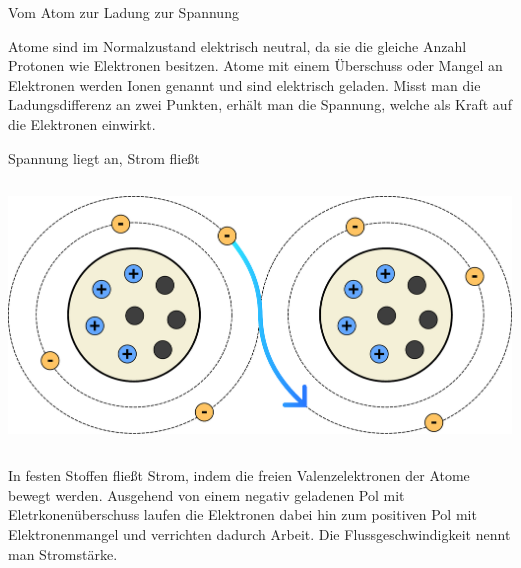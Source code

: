 \begin{frame}{Vom Atom zur Ladung zur Spannung}
    \bigskip
    \bigskip

    \parbox{\linewidth}{
        \footnotesize
        Atome sind im Normalzustand elektrisch neutral, da sie die gleiche Anzahl
        Protonen wie Elektronen besitzen. Atome mit einem Überschuss oder Mangel
        an Elektronen werden \glqq{}Ionen\grqq{} genannt und sind \glqq{}elektrisch
        geladen\grqq{}. Misst man die Ladungsdifferenz an zwei Punkten, erhält man
        die \glqq{}Spannung\grqq{}, welche als Kraft auf die Elektronen einwirkt.
    }
\end{frame}

\begin{frame}{Spannung liegt an, Strom fließt}
    \begin{columns}
        \column{\dimexpr\paperwidth-28pt}
        \begin{center}
            \includegraphics[width=.9\textwidth]{2-hardwaredesign/img/atom_elektronenfluss}
        \end{center}
    \end{columns}

    \bigskip

    \parbox{\linewidth}{
        \footnotesize
        In festen Stoffen fließt Strom, indem die freien Valenzelektronen der Atome
        bewegt werden. Ausgehend von einem negativ geladenen Pol mit Eletrkonenüberschuss
        laufen die Elektronen dabei hin zum positiven Pol mit Elektronenmangel und
        verrichten dadurch Arbeit. Die Flussgeschwindigkeit nennt man \glqq{}Stromstärke\grqq{}.
    }
\end{frame}

